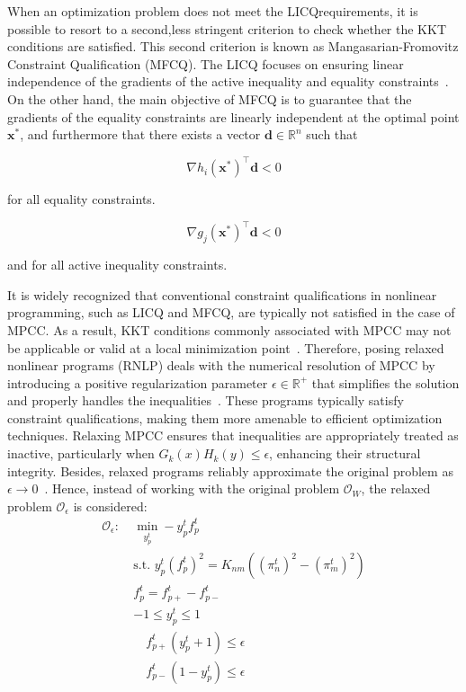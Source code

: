When an optimization problem does not meet the LICQrequirements, it is possible to resort to a second,less stringent criterion to check whether the KKT conditions are satisfied. This second criterion is known as Mangasarian-Fromovitz Constraint Qualification (MFCQ). The LICQ focuses on ensuring linear independence of the gradients of the active inequality and equality constraints~\citep{BertsekasDimitriP1999Np/D}. On the other hand, the main objective of MFCQ is to guarantee that the gradients of the equality constraints are linearly independent at the optimal point $\mathbf{x}^*$, and furthermore that there exists a vector $\mathbf{d} \in \mathbb{R}^n$ such that

 \begin{equation}
    \nabla h_i(\mathbf{x}^*)^\top \mathbf{d} < 0    
 \end{equation}
  
for all equality constraints.


\begin{equation}
    \nabla g_j(\mathbf{x}^*)^\top \mathbf{d} < 0    
\end{equation}

and for all active inequality constraints.  
 

It is widely recognized that conventional constraint qualifications in nonlinear programming, such as LICQ and MFCQ, are typically not satisfied in the case of MPCC. As a result, KKT conditions commonly associated with MPCC may not be applicable or valid at a local minimization point~\citep{Bouza_Still_2007}. Therefore, posing relaxed nonlinear programs (RNLP)  deals with the numerical resolution of MPCC by introducing a positive regularization parameter $\epsilon\in\mathbb{R}^+$ that simplifies the solution and properly handles the inequalities~\citep{Scholtes_2001}. These programs typically satisfy constraint qualifications, making them more amenable to efficient optimization techniques. Relaxing MPCC ensures that inequalities are appropriately treated as inactive, particularly when $G_k(x)H_k(y) \leq \epsilon$, enhancing their structural integrity. Besides, relaxed programs  reliably approximate the original problem as $\epsilon\to0$~\citep{Scheel_Scholtes_2000}. Hence, instead of working with the original problem $\mathcal{O}_W$, the relaxed problem $\mathcal{O}_\epsilon$ is considered:
\begin{subequations}
\begin{alignat}{4}
\label{eq:complementarity_relaxec1}
\mathcal{O}_\epsilon: \ &\min\limits_{y_p^t} -y_p^tf_{p}^t \\
&\text{s.t. } y_p^t(f_{p}^t)^2 = K_{nm}((\pi_{n}^t)^2-(\pi_{m}^t)^2)\\
&f_{p}^t = f_{p+}^t - f_{p-}^t\\
& -1 \leq y_p^t \leq 1 \\
&\quad f_{p+}^t(y_p^t+1) \leq \epsilon\label{eq:Oe:complementarity1} \\ \label{eq:Oe:complementarity2}
&\quad f_{p-}^t(1-y_p^t) \leq \epsilon
\end{alignat}
\end{subequations}


